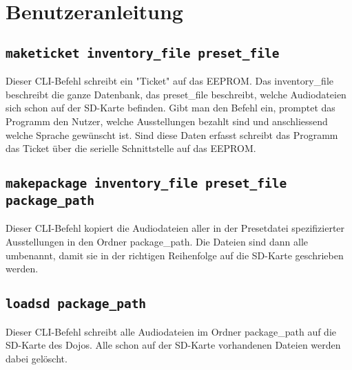 \thispagestyle{fancy}  

\section{Benutzeranleitung}
\subsection{\texttt{maketicket inventory\_file preset\_file}}
Dieser CLI-Befehl schreibt ein "Ticket" auf das EEPROM.
Das inventory\_file beschreibt die ganze Datenbank, 
das preset\_file beschreibt, welche Audiodateien sich schon auf der SD-Karte befinden.
Gibt man den Befehl ein, promptet das Programm den Nutzer, 
welche Ausstellungen bezahlt sind und anschliessend welche Sprache gewünscht ist.
Sind diese Daten erfasst schreibt das Programm das Ticket über die serielle Schnittstelle auf das EEPROM.
\subsection{\texttt{makepackage inventory\_file preset\_file package\_path}}
Dieser CLI-Befehl kopiert die Audiodateien aller in der Presetdatei spezifizierter Ausstellungen in den Ordner package\_path. 
Die Dateien sind dann alle umbenannt, damit sie in der richtigen Reihenfolge auf die SD-Karte geschrieben werden.
\subsection{\texttt{loadsd package\_path}}
Dieser CLI-Befehl schreibt alle Audiodateien im Ordner package\_path auf die SD-Karte des Dojos. Alle schon auf der SD-Karte vorhandenen Dateien werden dabei gelöscht.
